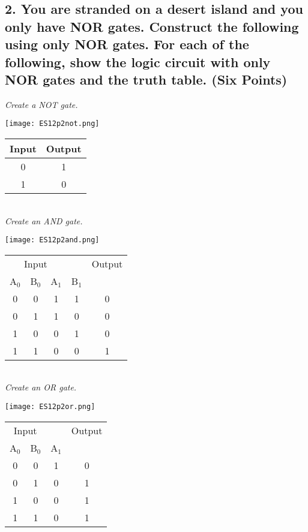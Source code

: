 \documentclass[a4paper,man,natbib]{apa6}
\begin{document}
\subsection{2. You are stranded on a desert island and you only have NOR gates.  Construct the following using only NOR gates. For each of the following, show the logic circuit with only NOR gates and the truth table. (Six Points)}
\emph{Create a NOT gate.} \\
	\begin{minipage}{2.5in}
		\texttt{[image: ES12p2not.png]}
	\end{minipage}
	\begin{minipage}{2.5in}
		\begin{tabular}{ c | c }
			Input & Output \\
			\hline
			0 & 1 \\
			1 & 0 \\
		\end{tabular}
	\end{minipage} ~\\
\emph{Create an AND gate.} \\
		\begin{minipage}{2.5in}
		\texttt{[image: ES12p2and.png]}
	\end{minipage}
	\begin{minipage}{2.5in}
		\begin{tabular}{ c c | c c | c }
			\multicolumn{3}{c}{Input} & & Output \\
			A$_{0}$ & B$_{0}$ & A$_{1}$ & B$_{1}$ & \\
			\hline
			0 & 0 & 1 & 1 & 0 \\
			0 & 1 & 1 & 0 & 0 \\
			1 & 0 & 0 & 1 & 0 \\
			1 & 1 & 0 & 0 & 1 \\
		\end{tabular}
	\end{minipage} ~\\
\emph{Create an OR gate.} \\
		\begin{minipage}{2.5in}
		\texttt{[image: ES12p2or.png]}
	\end{minipage}
	\begin{minipage}{2.5in}
		\begin{tabular}{ c c | c | c }
			\multicolumn{2}{c}{Input} & & Output \\
			A$_{0}$ & B$_{0}$ & A$_{1}$ & \\
			\hline
			0 & 0 & 1 & 0 \\
			0 & 1 & 0 & 1 \\
			1 & 0 & 0 & 1 \\
			1 & 1 & 0 & 1 \\
		\end{tabular}
	\end{minipage} ~\\
\end{document}
